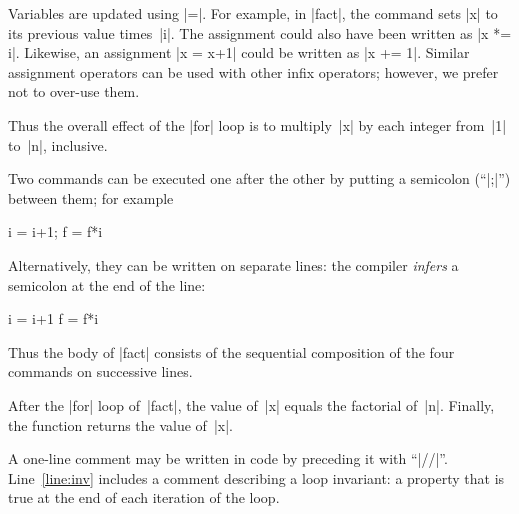


Variables are updated using |=|.  For example, in |fact|, the command
 sets |x| to its previous value times~|i|.  
%
The assignment could also have been written as |x *= i|.  Likewise, an
assignment |x = x+1| could be written as |x += 1|.  Similar assignment
operators can be used with other infix operators; however, we prefer not to
over-use them.

Thus the overall effect of the |for| loop is to multiply~|x| by each integer
from~|1| to~|n|, inclusive.  




Two commands can be executed one after the other by putting a semicolon
(``|;|'') between them; for example
\begin{scala}
  i = i+1; f = f*i
\end{scala}
Alternatively, they can be written on separate lines: the compiler
\emph{infers} a semicolon at the end of the line:
\begin{scala}
  i = i+1
  f = f*i
\end{scala}
Thus the body of |fact| consists of the sequential composition of the four
commands on successive lines.

After the |for| loop of~|fact|, the value of~|x| equals the factorial of~|n|.
Finally, the function returns the value of~|x|.

 
A one-line comment may be written in code by preceding it with ``|//|''.
Line~\ref{line:inv} includes a comment describing a loop invariant: a property
that is true at the end of each iteration of the loop. 


